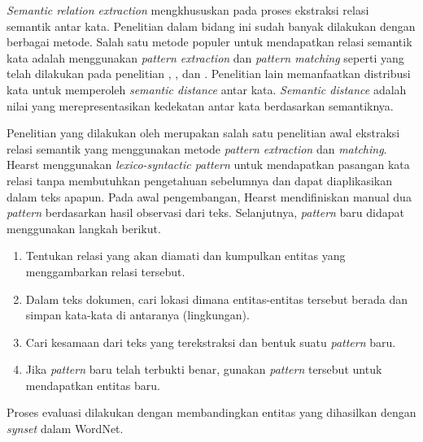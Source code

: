 \textit{Semantic relation extraction} mengkhususkan pada proses ekstraksi relasi semantik antar kata. Penelitian dalam bidang ini sudah banyak dilakukan dengan berbagai metode. Salah satu metode populer untuk mendapatkan relasi semantik kata adalah menggunakan \textit{pattern extraction} dan \textit{pattern matching} seperti yang telah dilakukan pada penelitian \cite{hearst1992automatic}, \cite{ruiz2005automatic}, dan \cite{arnold2014extracting}. Penelitian lain memanfaatkan distribusi kata untuk memperoleh \textit{semantic distance} antar kata. \textit{Semantic distance} adalah nilai yang merepresentasikan kedekatan antar kata berdasarkan semantiknya.

Penelitian yang dilakukan oleh \cite{hearst1992automatic} merupakan salah satu penelitian awal ekstraksi relasi semantik yang menggunakan metode \textit{pattern extraction} dan \textit{matching}. Hearst menggunakan \textit{lexico-syntactic pattern} untuk mendapatkan pasangan kata relasi tanpa membutuhkan pengetahuan sebelumnya dan dapat diaplikasikan dalam teks apapun. Pada awal pengembangan, Hearst mendifiniskan manual dua \textit{pattern} berdasarkan hasil observasi dari teks. Selanjutnya, \textit{pattern} baru didapat menggunakan langkah berikut. 
\begin{enumerate}
  \item Tentukan relasi yang akan diamati dan kumpulkan entitas yang menggambarkan relasi tersebut.
  \item Dalam teks dokumen, cari lokasi dimana entitas-entitas tersebut berada dan simpan kata-kata di antaranya (lingkungan).
  \item Cari kesamaan dari teks yang terekstraksi dan bentuk suatu \textit{pattern} baru.
  \item Jika \textit{pattern} baru telah terbukti benar, gunakan \textit{pattern} tersebut untuk mendapatkan entitas baru.
\end{enumerate}
Proses evaluasi dilakukan dengan membandingkan entitas yang dihasilkan dengan \textit{synset} dalam WordNet. 

